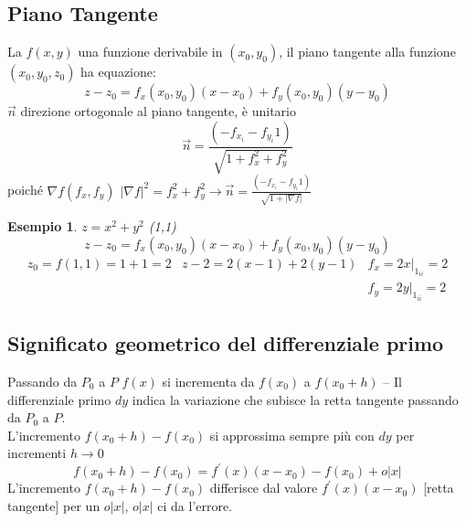 \documentclass{book}
\newtheorem{esempio}{Esempio}
\newcommand{\abs}[1]{\lvert#1\rvert}
\begin{document}
\subsection{Piano Tangente}
La $f(x,y)$ una funzione derivabile in $(x_0,y_0)$, il piano tangente alla funzione $(x_0,y_0,z_0)$
ha equazione:
\begin{equation*}
  z-z_0=f_x(x_0,y_0)(x-x_0)+f_y(x_0,y_0)(y-y_0)
\end{equation*}
$\vec{n}$ direzione ortogonale al piano tangente, è unitario
\begin{equation*}
  \vec{n}=\frac{(-f_{x_i}-f_{y_i}1)}{\sqrt{1+f_x^2+f_y^2}}
\end{equation*}
poiché $\nabla f(f_x,f_y)$ $\abs{\nabla f}^2=f_x^2+f_y^2\to \vec{n}=\frac{(-f_{x_i}-f_{y_i}1)}{\sqrt{1+\abs{\nabla f}}}$
\begin{esempio}
  $z=x^2+y^2$ (1,1)
  \begin{equation*}
    z-z_0=f_x(x_0,y_0)(x-x_0)+f_y(x_0,y_0)(y-y_0)
  \end{equation*}
  \begin{equation*}
    \begin{matrix}
      z_0=f(1,1)=1+1=2 & z-2=2(x-1)+2(y-1) & f_x=2x|_{1_{ii}}=2\\
                       & & f_y=2y|_{1_{ii}}=2
    \end{matrix}
  \end{equation*}
\end{esempio}
\subsection{Significato geometrico del differenziale primo}
Passando da $P_0$ a $P$ $f(x)$ si incrementa da $f(x_0)$ a $f(x_0+h)$ -- Il differenziale primo $dy$
indica la variazione che subisce la retta tangente passando da $P_0$ a $P$.\\
L'incremento $f(x_0+h)-f(x_0)$ si approssima sempre più con $dy$ per incrementi $h\to 0$
\begin{equation*}
  f(x_0+h)-f(x_0)=f^\prime (x)(x-x_0)-f(x_0)+o\abs{x}
\end{equation*}
L'incremento $f(x_0+h)-f(x_0)$ differisce dal valore $f^\prime (x)(x-x_0)$ [retta tangente] per un
$o\abs{x}$, $o\abs{x}$ ci da l'errore.
\end{document}
